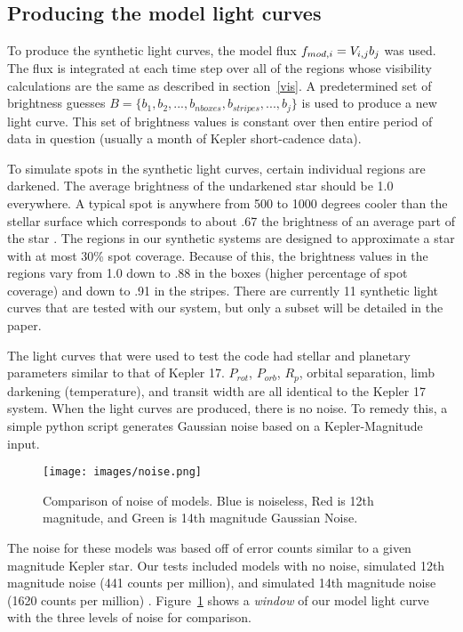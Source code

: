 

\subsection{Producing the model light curves \label{modelLC}}
To produce the synthetic light curves, the model flux $\mbox{$f_{mod,i}$} = V_{i,j} b_j$ was used. The flux is integrated at each time step over all of the regions whose visibility calculations are the same as described in section~\ref{vis}. A predetermined set of brightness guesses $B = \{b_1, b_2, ..., b_{nboxes}, b_{stripes}, ..., b_j\}$ is used to produce a new light curve. This set of brightness values is constant over then entire period of data in question (usually a month of Kepler short-cadence data).

To simulate spots in the synthetic light curves, certain individual regions are darkened. The average brightness of the undarkened star should be 1.0 everywhere. A typical spot is anywhere from 500 to 1000 degrees cooler than the stellar surface which corresponds to about .67 the brightness of an average part of the star \citep{Walkowicz2013}. The regions in our synthetic systems are designed to approximate a star with at most 30\% spot coverage. Because of this, the brightness values in the regions vary from 1.0 down to .88 in the boxes (higher percentage of spot coverage) and down to .91 in the stripes. There are currently 11 synthetic light curves that are tested with our system, but only a subset will be detailed in the paper.

The light curves that were used to test the code had stellar and planetary parameters similar to that of Kepler 17. $P_{rot}$, $P_{orb}$, $R_p$, orbital separation, limb darkening (temperature), and transit width are all identical to the Kepler 17 system. When the light curves are produced, there is no noise. To remedy this, a simple python script generates Gaussian noise based on a Kepler-Magnitude input. 

\begin{figure}
	\centering
	\texttt{[image: images/noise.png]}
	\caption{Comparison of noise of models. Blue is noiseless, Red is 12th magnitude, and Green is 14th magnitude Gaussian Noise.}
	\label{noise_comp}
\end{figure}

The noise for these models was based off of error counts similar to a given magnitude Kepler star. Our tests included models with no noise, simulated 12th magnitude noise (441 counts per million), and simulated 14th magnitude noise (1620 counts per million) \citep{noiseCounts}. Figure~\ref{noise_comp} shows a {\it window} of our model light curve with the three levels of noise for comparison.



